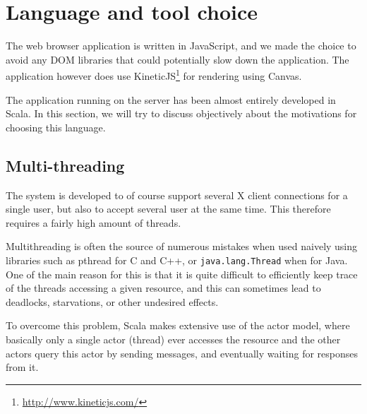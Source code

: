 \section{Language and tool choice}
%
The web browser application is written in JavaScript, and we made the 
choice to avoid any DOM libraries that could potentially slow down the application.
The application however does use KineticJS\footnote{\url{http://www.kineticjs.com/}}
for rendering using Canvas.
%

The application running on the server has been almost entirely developed in Scala. 
In this section, we will try to discuss objectively about 
the motivations for choosing this language.
%
\subsection{Multi-threading}
The system is developed to of course support several X client connections 
for a single user, but also to accept several user at the same time.
This therefore requires a fairly high amount of threads.

Multithreading is often the source of numerous mistakes when used naively 
using libraries such as pthread for C and C++, or \lstinline{java.lang.Thread} 
when for Java. One of the main reason for this is that it is quite difficult to 
efficiently keep trace of the threads accessing a given resource, 
and this can sometimes lead to deadlocks, starvations, or other undesired 
effects.

To overcome this problem, Scala makes extensive use of the actor model, where 
basically only a single actor (thread) ever accesses the resource and 
the other actors query this actor by sending messages, and eventually waiting 
for responses from it.